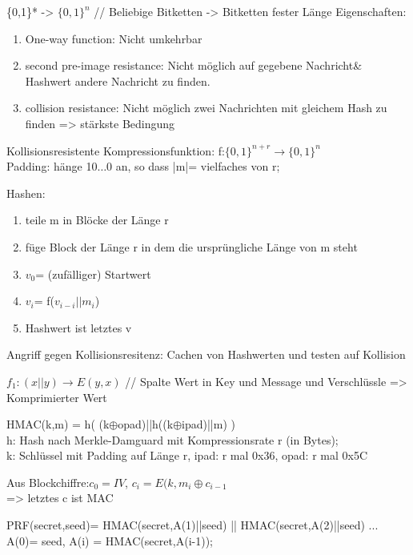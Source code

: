 \{0,1\}* -> $\{0,1\}^n$ // Beliebige Bitketten -> Bitketten fester Länge
Eigenschaften: \begin{enumerate}
\item One-way function: Nicht umkehrbar
\item second pre-image resistance: Nicht möglich auf gegebene Nachricht\& Hashwert andere Nachricht zu finden.
\item collision resistance: Nicht möglich zwei Nachrichten mit gleichem Hash zu finden => stärkste Bedingung
\end{enumerate}

Kollisionsresistente Kompressionsfunktion: f:$\{0,1\}^{n+r} \rightarrow \{0,1\}^n$	\\

Padding: hänge 10$\dots$0 an, so dass |m|= vielfaches von r;

Hashen: %
\begin{enumerate}
\item teile m in Blöcke der Länge r
\item füge Block der Länge r in dem die ursprüngliche Länge von m steht
\item $v_0$= (zufälliger) Startwert
\item $v_i$= f($v_{i-i}||m_i$)
\item Hashwert ist letztes v
\end{enumerate}

Angriff gegen Kollisionsresitenz: Cachen von Hashwerten und testen auf Kollision

$f_1: (x||y) \rightarrow E(y,x)$ // Spalte Wert in Key und Message und Verschlüssle => Komprimierter Wert 

HMAC(k,m) = h( (k$\oplus$opad)||h((k$\oplus$ipad)||m) )\\
h: Hash nach Merkle-Damguard mit Kompressionsrate r (in Bytes);\\
k: Schlüssel mit Padding auf Länge r, ipad: r mal 0x36, opad: r mal 0x5C

Aus Blockchiffre:$c_0=IV$, $c_i= E(k,m_i\oplus c_{i-1}$\\
=> letztes c ist MAC

PRF(secret,seed)= HMAC(secret,A(1)||seed) || HMAC(secret,A(2)||seed) ...\\
A(0)= seed, A(i) = HMAC(secret,A(i-1));
